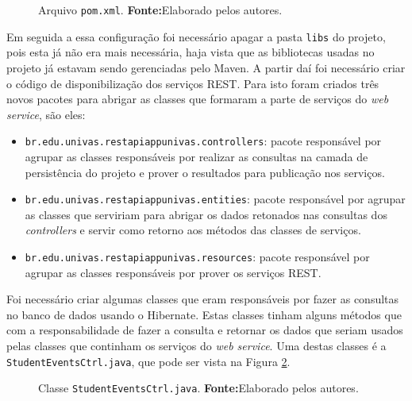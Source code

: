 	\begin{figure}[h!]
		
		\caption[Arquivo pom.xml]{Arquivo \texttt{pom.xml}.
		\textbf{Fonte:}Elaborado pelos autores.}
		\label{fig:desws18_1}
	\end{figure}

	\par Em seguida a essa configuração foi necessário apagar a pasta \texttt{libs}
do projeto, pois esta já não era mais necessária, haja vista que as bibliotecas
usadas no projeto já estavam sendo gerenciadas pelo Maven. A partir daí foi
necessário criar o código de disponibilização dos serviços REST. Para isto
foram criados três novos pacotes para abrigar as classes que formaram a parte
de serviços do \textit{web service}, são eles:
	
	\begin{itemize}
	  \item \texttt{br.edu.univas.restapiappunivas.controllers}: pacote responsável
	  por agrupar as classes responsáveis por realizar as consultas na camada de
	  persistência do projeto e prover o resultados para publicação nos serviços.
	  \item \texttt{br.edu.univas.restapiappunivas.entities}: pacote responsável
	  por agrupar as classes que serviriam para abrigar os dados retonados nas
	  consultas dos \textit{controllers} e servir como retorno aos métodos das
	  classes de serviços.
	  \item \texttt{br.edu.univas.restapiappunivas.resources}: pacote responsável
	  por agrupar as classes responsáveis por prover os serviços REST.
	\end{itemize}


	\par Foi necessário criar algumas classes que eram responsáveis por fazer as
consultas no banco de dados usando o Hibernate. Estas classes tinham alguns
métodos que com a responsabilidade de fazer a consulta e retornar os dados
que seriam usados pelas classes que continham os serviços do \textit{web
service}.
Uma destas classes é a \texttt{StudentEventsCtrl.java}, que pode ser vista na
Figura \ref{fig:desws19}.
	
	\begin{figure}[h!]
		
		\caption[Classe StudentEventsCtrl.java]{Classe
		\texttt{StudentEventsCtrl.java}.
		\textbf{Fonte:}Elaborado pelos autores.}
		\label{fig:desws19}
	\end{figure}

	\pagebreak
	
